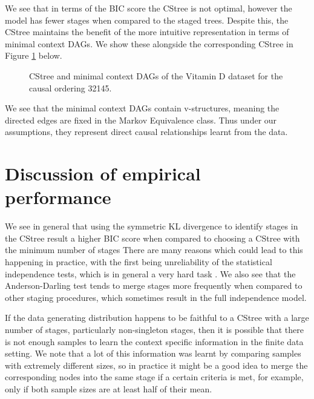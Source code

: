 \documentclass{tufte-book}
\begin{document}
We see that in terms of the BIC score the CStree is not optimal, however the model has fewer stages when compared to the staged trees. Despite this, the CStree maintains the benefit of the more intuitive representation in terms of minimal context DAGs. We show these alongside the corresponding CStree in Figure \ref{fig:vitd_mcdags} below.

\begin{figure}[!h]\label{fig:vitd_mcdags}
   \begin{floatrow}
%
\caption{ CStree and minimal context DAGs of the Vitamin D dataset for the causal ordering 32145. }
        
   \end{floatrow}
\end{figure}


We see that the minimal context DAGs contain v-structures, meaning the directed edges are fixed in the Markov Equivalence class. Thus under our assumptions, they represent direct causal relationships learnt from the data.


\section{Discussion of empirical performance}
\label{sec:org1f2db20}

We see in general that using the symmetric KL divergence to identify stages in the CStree result a higher BIC score when compared to choosing a CStree with the minimum number of stages There are many reasons which could lead to this happening in practice, with the first being unreliability of the statistical independence tests, which is in general a very hard task \cite{shah-2020-hardn-condit}.  We also see that the Anderson-Darling test tends to merge stages more frequently when compared to other staging procedures, which sometimes result in the full independence model. 


If the data generating distribution happens to be faithful to a CStree with a large number of stages, particularly non-singleton stages, then it is possible that there is not enough samples to learn the context specific information in the finite data setting. We note that a lot of this information was learnt by comparing samples with extremely different sizes, so in practice it might be a good idea to merge the corresponding nodes into the same stage if a certain criteria is met, for example, only if both sample sizes are at least half of their mean.
\end{document}
